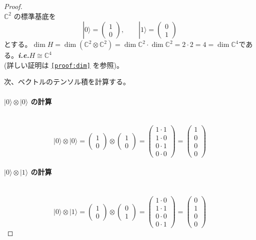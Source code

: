 \documentclass[dvipdfmx,a4paper]{jsarticle}
\makeatletter
\newcommand*{\ie}{\textbf{\textit{i.e.}}\@\xspace}
\theoremstyle{mystyle}
\makeatother
\begin{document}
\begin{proof}
\ \\
$\mathbb{C}^2$ の標準基底を
\[
|0\rangle=
\begin{pmatrix}
1\\
0
\end{pmatrix},
\qquad
|1\rangle=
\begin{pmatrix}
0\\
1
\end{pmatrix}
\]
とする。$\dim{H} = \dim{(\mathbb{C}^2\otimes\mathbb{C}^2)}=\dim{\mathbb{C}^2}\cdot \dim{\mathbb{C}^2}=2\cdot 2=4 = \dim{\mathbb{C}^4}$である。\ie $H\cong\mathbb{C}^4$\\
\noindent
(詳しい証明は \texttt{\ref{proof:dim}} を参照)。

\medskip
\noindent
次、ベクトルのテンソル積を計算する。
\paragraph{\textbf{$|0\rangle\otimes|0\rangle$ の計算}} \ \\
\[
|0\rangle\otimes|0\rangle
=
\begin{pmatrix}
1\\
0
\end{pmatrix}
\otimes
\begin{pmatrix}
1\\
0
\end{pmatrix}
=
\begin{pmatrix}
1\cdot 1\\
1\cdot 0\\
0\cdot 1\\
0\cdot 0
\end{pmatrix}
=
\begin{pmatrix}
1\\
0\\
0\\
0
\end{pmatrix}
\]

\paragraph{\textbf{$|0\rangle\otimes|1\rangle$ の計算}} \ \\
\[
|0\rangle\otimes|1\rangle
=
\begin{pmatrix}
1\\
0
\end{pmatrix}
\otimes
\begin{pmatrix}
0\\
1
\end{pmatrix}
=
\begin{pmatrix}
1\cdot 0\\
1\cdot 1\\
0\cdot 0\\
0\cdot 1
\end{pmatrix}
=
\begin{pmatrix}
0\\
1\\
0\\
0
\end{pmatrix}
\]


\end{proof}
\end{document}
